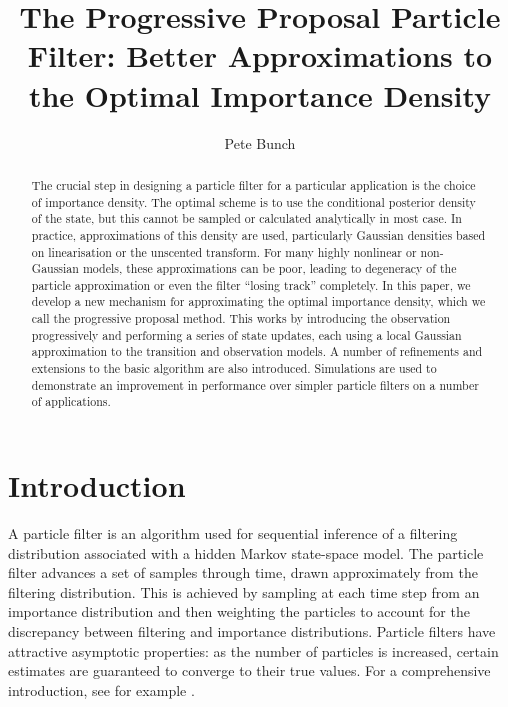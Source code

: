 \documentclass{article}
\title{The Progressive Proposal Particle Filter: Better Approximations to the Optimal Importance Density}
\author{Pete Bunch}
\begin{document}
\maketitle

\begin{abstract}
The crucial step in designing a particle filter for a particular application is the choice of importance density. The optimal scheme is to use the conditional posterior density of the state, but this cannot be sampled or calculated analytically in most case. In practice, approximations of this density are used, particularly Gaussian densities based on linearisation or the unscented transform. For many highly nonlinear or non-Gaussian models, these approximations can be poor, leading to degeneracy of the particle approximation or even the filter ``losing track'' completely. In this paper, we develop a new mechanism for approximating the optimal importance density, which we call the progressive proposal method. This works by introducing the observation progressively and performing a series of state updates, each using a local Gaussian approximation to the transition and observation models. A number of refinements and extensions to the basic algorithm are also introduced. Simulations are used to demonstrate an improvement in performance over simpler particle filters on a number of applications.
\end{abstract}






\section{Introduction}

A particle filter is an algorithm used for sequential inference of a filtering distribution associated with a hidden Markov state-space model. The particle filter advances a set of samples through time, drawn approximately from the filtering distribution. This is achieved by sampling at each time step from an importance distribution and then weighting the particles to account for the discrepancy between filtering and importance distributions. Particle filters have attractive asymptotic properties: as the number of particles is increased, certain estimates are guaranteed to converge to their true values. For a comprehensive introduction, see for example \citep{Cappe2007,Doucet2009}.
\end{document}
